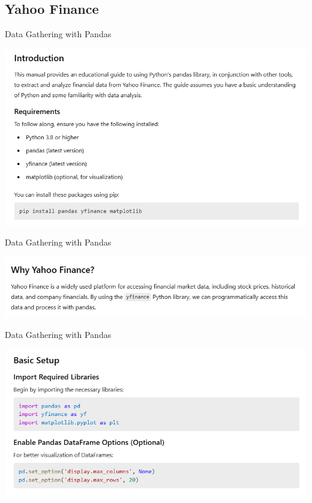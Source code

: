 \documentclass[11pt]{beamer}
\begin{document}
\subsection{Yahoo Finance \\ }
\begin{frame}{Data Gathering with Pandas}
	\begin{center}
	\includegraphics[scale=0.55]{../05-pictures/lesson-1-3_pic_10.png}
	\end{center}
\end{frame}
\begin{frame}{Data Gathering with Pandas}
	\begin{center}
	\includegraphics[scale=0.55]{../05-pictures/lesson-1-3_pic_11.png}
	\end{center}
\end{frame}
\begin{frame}{Data Gathering with Pandas}
	\begin{center}
	\includegraphics[scale=0.55]{../05-pictures/lesson-1-3_pic_12.png}
	\end{center}
\end{frame}
\end{document}
